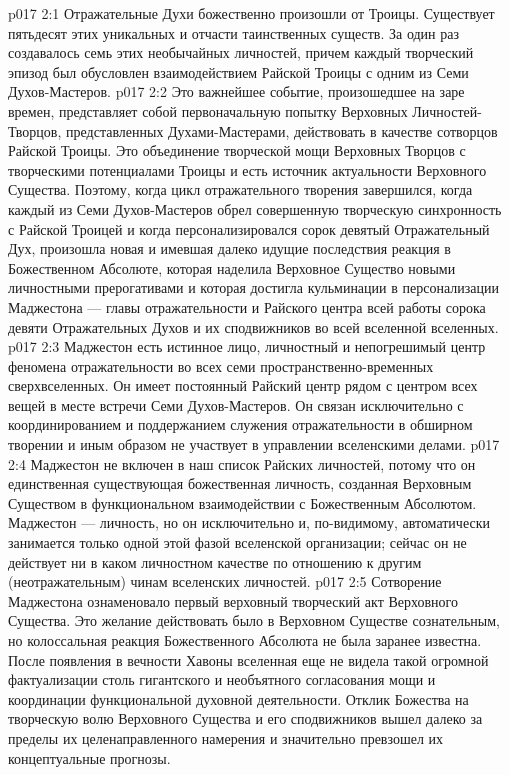 \vs p017 2:1 Отражательные Духи божественно произошли от Троицы. Существует пятьдесят этих уникальных и отчасти таинственных существ. За один раз создавалось семь этих необычайных личностей, причем каждый творческий эпизод был обусловлен взаимодействием Райской Троицы с одним из Семи Духов\hyp{}Мастеров.
\vs p017 2:2 Это важнейшее событие, произошедшее на заре времен, представляет собой первоначальную попытку Верховных Личностей\hyp{}Творцов, представленных Духами\hyp{}Мастерами, действовать в качестве сотворцов Райской Троицы. Это объединение творческой мощи Верховных Творцов с творческими потенциалами Троицы и есть источник актуальности Верховного Существа. Поэтому, когда цикл отражательного творения завершился, когда каждый из Семи Духов\hyp{}Мастеров обрел совершенную творческую синхронность с Райской Троицей и когда персонализировался сорок девятый Отражательный Дух, произошла новая и имевшая далеко идущие последствия реакция в Божественном Абсолюте, которая наделила Верховное Существо новыми личностными прерогативами и которая достигла кульминации в персонализации Маджестона --- главы отражательности и Райского центра всей работы сорока девяти Отражательных Духов и их сподвижников во всей вселенной вселенных.
\vs p017 2:3 Маджестон есть истинное лицо, личностный и непогрешимый центр феномена отражательности во всех семи пространственно\hyp{}временных сверхвселенных. Он имеет постоянный Райский центр рядом с центром всех вещей в месте встречи Семи Духов\hyp{}Мастеров. Он связан исключительно с координированием и поддержанием служения отражательности в обширном творении и иным образом не участвует в управлении вселенскими делами.
\vs p017 2:4 Маджестон не включен в наш список Райских личностей, потому что он единственная существующая божественная личность, созданная Верховным Существом в функциональном взаимодействии с Божественным Абсолютом. Маджестон --- личность, но он исключительно и, по\hyp{}видимому, автоматически занимается только одной этой фазой вселенской организации; сейчас он не действует ни в каком личностном качестве по отношению к другим (неотражательным) чинам вселенских личностей.
\vs p017 2:5 \pc Сотворение Маджестона ознаменовало первый верховный творческий акт Верховного Существа. Это желание действовать было в Верховном Существе сознательным, но колоссальная реакция Божественного Абсолюта не была заранее известна. После появления в вечности Хавоны вселенная еще не видела такой огромной фактуализации столь гигантского и необъятного согласования мощи и координации функциональной духовной деятельности. Отклик Божества на творческую волю Верховного Существа и его сподвижников вышел далеко за пределы их целенаправленного намерения и значительно превзошел их концептуальные прогнозы.

